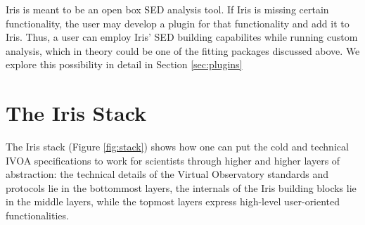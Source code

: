 \documentclass[5p]{elsarticle}
\begin{document}

Iris is meant to be an open box SED analysis tool. If Iris is missing certain functionality, the user may develop a plugin for that functionality and add it to Iris. Thus, a user can employ Iris' SED building capabilites while running custom analysis, which in theory could be one of the fitting packages discussed above. We explore this possibility in detail in Section \ref{sec:plugins}



%

\section{The Iris Stack}
\label{sec:stack}

The Iris stack (Figure \ref{fig:stack}) shows how one can put the cold and technical IVOA specifications to work for scientists through higher and higher layers of abstraction: the technical details of the Virtual Observatory standards and protocols lie in the bottommost layers, the internals of the Iris building blocks lie in the middle layers, while the topmost layers express high-level user-oriented functionalities.
\end{document}
